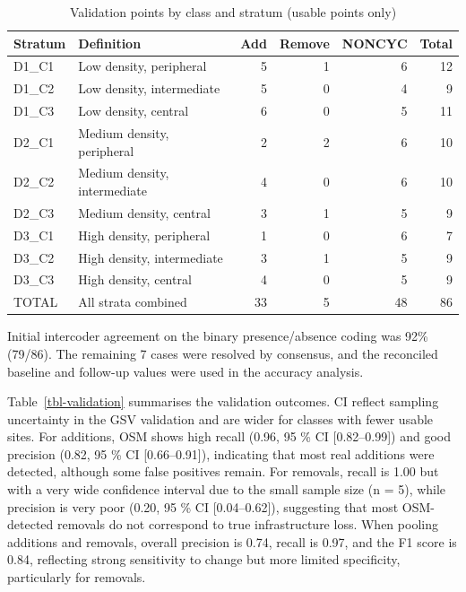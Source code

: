 \documentclass[
]{article}
\begin{document}
{

\begin{longtable}[]{@{}llrrrr@{}}

\caption{\label{tbl-summary_stratum}Validation points by class and
stratum (usable points only)}

\tabularnewline

\toprule\noalign{}
Stratum & Definition & Add & Remove & NONCYC & Total \\
\midrule\noalign{}
\endhead
\bottomrule\noalign{}
\endlastfoot
D1\_C1 & Low density, peripheral & 5 & 1 & 6 & 12 \\
D1\_C2 & Low density, intermediate & 5 & 0 & 4 & 9 \\
D1\_C3 & Low density, central & 6 & 0 & 5 & 11 \\
D2\_C1 & Medium density, peripheral & 2 & 2 & 6 & 10 \\
D2\_C2 & Medium density, intermediate & 4 & 0 & 6 & 10 \\
D2\_C3 & Medium density, central & 3 & 1 & 5 & 9 \\
D3\_C1 & High density, peripheral & 1 & 0 & 6 & 7 \\
D3\_C2 & High density, intermediate & 3 & 1 & 5 & 9 \\
D3\_C3 & High density, central & 4 & 0 & 5 & 9 \\
TOTAL & All strata combined & 33 & 5 & 48 & 86 \\

\end{longtable}

}

Initial intercoder agreement on the binary presence/absence coding was
92\% (79/86). The remaining 7 cases were resolved by consensus, and the
\color{black}reconciled \color{black} baseline and follow-up values were
used in the accuracy analysis.

Table~\ref{tbl-validation} summarises the validation outcomes. CI
reflect sampling uncertainty in the GSV validation and are wider for
classes with fewer usable sites. For additions, OSM shows high recall
(0.96, 95 \% CI {[}0.82--0.99{]}) and good precision (0.82, 95 \% CI
{[}0.66--0.91{]}), indicating that most real additions were detected,
although some false positives remain. For removals, recall is 1.00 but
with a very wide confidence interval due to the small sample size (n =
5), while precision is very poor (0.20, 95 \% CI {[}0.04--0.62{]}),
suggesting that most OSM-detected removals do not correspond to true
infrastructure loss. When pooling additions and removals, overall
precision is 0.74, recall is 0.97, and the F1 score is 0.84, reflecting
strong sensitivity to change but more limited specificity, particularly
for removals.
\end{document}
